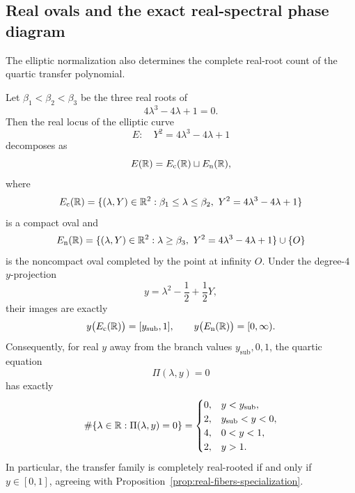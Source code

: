 \subsection{Real ovals and the exact real-spectral phase diagram}

The elliptic normalization also determines the complete real-root count of the quartic transfer polynomial.

\begin{theorem}\label{thm:real-phase-diagram}
Let $\beta_1 < \beta_2 < \beta_3$ be the three real roots of
\[
4\lambda^3 - 4\lambda + 1 = 0.
\]
Then the real locus of the elliptic curve
\[
E:\quad Y^2 = 4\lambda^3 - 4\lambda + 1
\]
decomposes as
\[
E(\mathbb{R})=E_{\mathrm{c}}(\mathbb{R})\sqcup E_{\mathrm{n}}(\mathbb{R}),
\]
where
\[
E_{\mathrm{c}}(\RR)
=\{(\lambda,Y)\in\RR^2:\beta_1\le \lambda\le \beta_2,\ Y^2=4\lambda^3-4\lambda+1\}
\]
is a compact oval and
\[
E_{\mathrm{n}}(\RR)
=\{(\lambda,Y)\in\RR^2:\lambda\ge \beta_3,\ Y^2=4\lambda^3-4\lambda+1\}\cup\{O\}
\]
is the noncompact oval completed by the point at infinity $O$.
Under the degree-$4$ \(y\)-projection
\[
y=\lambda^2-\frac12+\frac12Y,
\]
their images are exactly
\begin{equation}\label{eq:real-oval-images}
y\bigl(E_{\mathrm{c}}(\mathbb{R})\bigr)=[y_{\mathrm{sub}},1],
\qquad
y\bigl(E_{\mathrm{n}}(\mathbb{R})\bigr)=[0,\infty).
\end{equation}
Consequently, for real $y$ away from the branch values $y_{\mathrm{sub}},0,1$, the quartic equation
\[
\Pi(\lambda,y)=0
\]
has exactly
\begin{equation}\label{eq:real-root-counts}
\#\{\lambda\in\mathbb{R}:\Pi(\lambda,y)=0\}
=
\begin{cases}
0, & y<y_{\mathrm{sub}},\\
2, & y_{\mathrm{sub}}<y<0,\\
4, & 0<y<1,\\
2, & y>1.
\end{cases}
\end{equation}
In particular, the transfer family is completely real-rooted if and only if $y\in[0,1]$, agreeing with Proposition~\ref{prop:real-fibers-specialization}.
\end{theorem}


